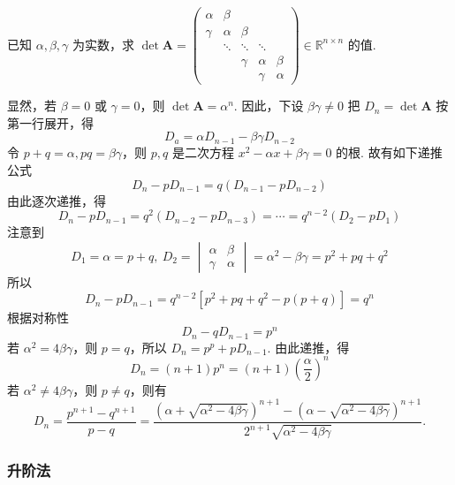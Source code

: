\begin{example}[2006 中国科学院]
    已知 $\alpha,\beta,\gamma$ 为实数，求
    $\det\boldsymbol{A}=\begin{pmatrix}
            \alpha & \beta  &        &        &        \\
            \gamma & \alpha & \beta  &        &        \\
                   & \ddots & \ddots & \ddots &        \\
                   &        & \gamma & \alpha & \beta  \\
                   &        &        & \gamma & \alpha
        \end{pmatrix}\in \mathbb{R}^{n\times n}$ 的值.
\end{example}
\begin{solution}
    显然，若 $\beta=0$ 或 $\gamma=0$，则 $\det\boldsymbol{A}=\alpha^n$. 因此，下设 $\beta\gamma\not=0$
    把 $D_n=\det\boldsymbol{A}$ 按第一行展开，得 $$D_a=\alpha D_{n-1}-\beta\gamma D_{n-2}$$
    令 $p+q=\alpha,pq=\beta\gamma$，则 $p,q$ 是二次方程 $x^2-\alpha x+\beta\gamma=0$ 的根. 故有如下递推公式
    $$D_n-pD_{n-1}=q(D_{n-1}-pD_{n-2})$$
    由此逐次递推，得 $$D_n-pD_{n-1}=q^2(D_{n-2}-pD_{n-3})=\cdots=q^{n-2}(D_2-pD_1)$$
    注意到 $$D_1=\alpha=p+q,~D_2=\begin{vmatrix}
            \alpha & \beta  \\
            \gamma & \alpha
        \end{vmatrix}=\alpha^2-\beta\gamma=p^2+pq+q^2$$
    所以 $$D_n-pD_{n-1}=q^{n-2}[p^2+pq+q^2-p(p+q)]=q^n$$
    根据对称性 $$D_n-qD_{n-1}=p^n$$
    若 $\alpha^2=4\beta\gamma$，则 $p=q$，所以 $D_n=p^p+pD_{n-1}$. 由此递推，得
    $$D_n=(n+1)p^n=(n+1)\left(\frac{\alpha}{2}\right)^n$$
    若 $\alpha^2\not=4\beta\gamma$，则 $p\not=q$，则有
    $$D_n=\frac{p^{n+1}-q^{n+1}}{p-q}=\frac{\left(\alpha+\sqrt{\alpha^2-4\beta\gamma}\right)^{n+1}-\left(\alpha-\sqrt{\alpha^2-4\beta\gamma}\right)^{n+1}}{2^{n+1}\sqrt{\alpha^2-4\beta\gamma}}.$$
\end{solution}

\subsubsection{升阶法}


